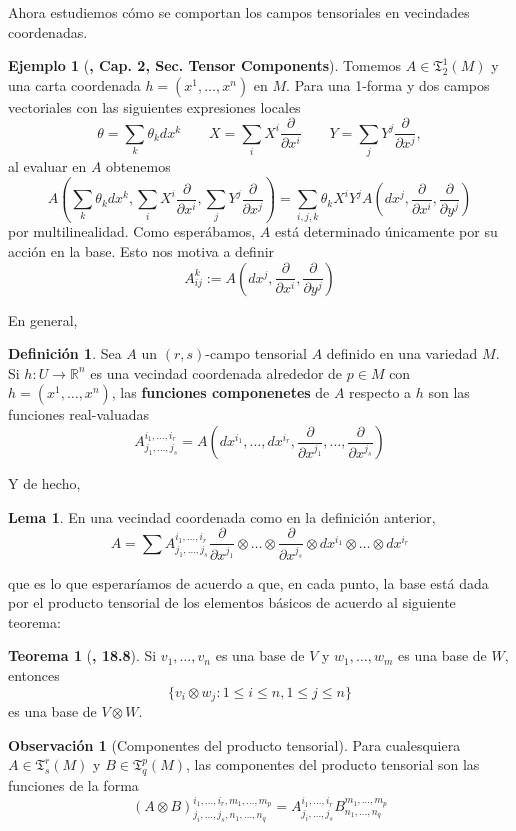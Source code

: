 \documentclass[spanish]{book}
\theoremstyle{definition}
\newtheorem*{defn}{Definición}
\newtheorem*{teo}{Teorema}
\newtheorem*{lema}{Lema}
\newtheorem*{obs}{Observación}
\newtheorem*{ejem}{Ejemplo}
\newcommand{\R}{\mathbb{R}}
\newcommand{\T}{\mathfrak{T}}
\begin{document}
	Ahora estudiemos cómo se comportan los campos tensoriales en vecindades coordenadas.
	\begin{ejem}[\cite{ONeill}\textbf{, Cap. 2, Sec. Tensor Components}]
		Tomemos $A\in\T^1_2(M)$ y una carta coordenada $h=(x^1,\ldots,x^n)$ en $M$. Para una 1-forma y dos campos vectoriales con las siguientes expresiones locales
		\[\theta=\sum_k\theta_kdx^k\qquad X=\sum_i X^i\frac{\partial}{\partial x^i}\qquad Y=\sum_j Y^j\frac{\partial}{\partial x^j},\]
		al evaluar en $A$ obtenemos
		\[A\left(\sum_k\theta_kdx^k,\sum_i X^i\frac{\partial}{\partial x^i},\sum_j Y^j\frac{\partial}{\partial x^j}\right)=\sum_{i,j,k}\theta_kX^iY^jA\left(dx^j,\frac{\partial}{\partial x^i},\frac{\partial}{\partial y^j}\right)\]
		por multilinealidad. Como esperábamos, $A$ está determinado únicamente por su acción en la base. Esto nos motiva a definir
		\[A_{ij}^k:=A\left(dx^j,\frac{\partial}{\partial x^i},\frac{\partial}{\partial y^j}\right)\]
	\end{ejem}
	En general,
	\begin{defn}
		Sea $A$ un $(r,s)$-campo tensorial $A$ definido en una variedad $M$. Si ${h:U\to\R^n}$ es una vecindad coordenada alrededor de $p\in M$ con $h=(x^1,\ldots,x^n)$, las \textbf{funciones componenetes} de $A$ respecto a $h$ son las funciones real-valuadas
		\[A^{i_1,\ldots,i_r}_{j_1,\ldots,j_s}=A\left(dx^{i_1},\ldots,dx^{i_r},\frac{\partial}{\partial x^{j_1}},\ldots,\frac{\partial}{\partial x^{j_s}}\right)\]
	\end{defn}
	Y de hecho,
	\begin{lema}
		En una vecindad coordenada como en la definición anterior,
		\[A=\sum A^{i_1,\ldots,i_r}_{j_1,\ldots,j_s}\frac{\partial}{\partial x^{j_1}}\otimes\ldots\otimes\frac{\partial}{\partial x^{j_s}}\otimes dx^{i_1}\otimes\ldots\otimes dx^{i_r}\]
	\end{lema}
	que es lo que esperaríamos de acuerdo a que, en cada punto, la base está dada por el producto tensorial de los elementos básicos de acuerdo al siguiente teorema:
	\begin{teo}[\cite{Loring-dif}\textbf{, 18.8}]
		Si $v_1,\ldots,v_n$ es una base de $V$ y $w_1,\ldots,w_m$ es una base de $W$, entonces
		\[\{v_i\otimes w_j:1\leq i\leq n,1\leq j\leq n\}\]
		es una base de $V\otimes W$.
	\end{teo}
	\begin{obs}[Componentes del producto tensorial]
		Para cualesquiera $A\in\T^r_s(M)$ y $B\in\T^p_q(M)$, las componentes del producto tensorial son las funciones de la forma
		\[(A\otimes B)^{i_1,\ldots,i_r,m_1,\ldots,m_p}_{j_i,\ldots,j_s,n_1,\ldots,n_q}=A^{i_1,\ldots,i_r}_{j_i,\ldots,j_s}B^{m_1,\ldots,m_p}_{n_1,\ldots,n_q}\]
	\end{obs}
\end{document}
